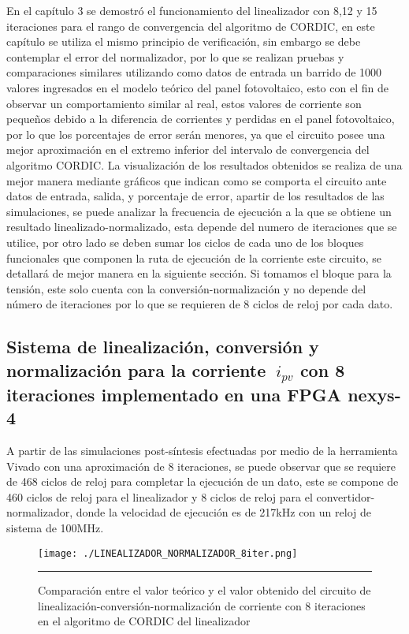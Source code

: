 En el capítulo 3 se demostró el funcionamiento del linealizador con 8,12 y 15 iteraciones para el rango de convergencia del algoritmo de CORDIC, en este capítulo se utiliza el mismo principio de verificación, sin embargo se debe contemplar el error del normalizador, por lo que se realizan pruebas y comparaciones similares utilizando como datos de entrada un barrido de 1000 valores ingresados en el modelo teórico del panel fotovoltaico, esto con el fin de observar un comportamiento similar al real, estos valores de corriente son pequeños debido a la diferencia de corrientes y perdidas en el panel fotovoltaico, por lo que los porcentajes de error serán menores, ya que el circuito posee una mejor aproximación en el extremo inferior del intervalo de convergencia del algoritmo CORDIC. La visualización de los resultados obtenidos se realiza de una mejor manera mediante gráficos que indican como se comporta el circuito ante datos de entrada, salida, y porcentaje de error, apartir de los resultados de las simulaciones, se puede analizar la frecuencia de ejecución a la que se obtiene un resultado linealizado-normalizado, esta depende del numero de iteraciones que se utilice, por otro lado se deben sumar los ciclos de cada uno de los bloques funcionales que componen la ruta de ejecución de la corriente este circuito, se detallará de mejor manera en la siguiente sección.
Si tomamos el bloque para la tensión, este solo cuenta con la conversión-normalización y no depende del número de iteraciones por lo que se requieren de 8 ciclos de reloj por cada dato. 

\subsection{Sistema de linealización, conversión y normalización para la corriente $\ i_{pv}$ con 8 iteraciones implementado en una FPGA nexys-4} 
 
A partir de las simulaciones post-síntesis efectuadas por medio de la herramienta Vivado con una aproximación de 8 iteraciones, se puede observar que se requiere de 468 ciclos de reloj para completar la ejecución de un dato, este se compone de 460 ciclos de reloj para el linealizador y 8 ciclos de reloj para el convertidor-normalizador, donde la velocidad de ejecución es de 217kHz con un reloj de sistema de 100MHz.  

\begin{figure}[H]
  \centering
    \texttt{[image: ./LINEALIZADOR\_NORMALIZADOR\_8iter.png]}
    \rule{35em}{0.5pt}
  \caption[Comparación entre el valor teórico y el valor obtenido del circuito de linealización-conversión-normalización de corriente con 8 iteraciones en el algoritmo de CORDIC del linealizador]{Comparación entre el valor teórico y el valor obtenido del circuito de linealización-conversión-normalización de corriente con 8 iteraciones en el algoritmo de CORDIC del linealizador}
  \label{fig:LIN_NOR_8}
\end{figure}

